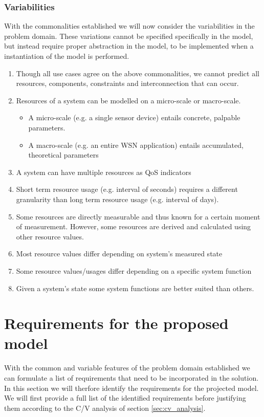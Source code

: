 \subsubsection{Variabilities}
With the commonalities established we will now consider the variabilities in the problem domain. These variations cannot be specified specifically in the model, but instead require proper abstraction in the model, to be implemented when a instantiation of the model is performed.
\begin{enumerate}[label=V\rdmid .\arabic*]
\nospace
\item \label{v:1obvious} Though all use cases agree on the above commonalities, we cannot predict all resources, components, constraints and interconnection that can occur.
\item \label{v:2micro_macro} Resources of a system can be modelled on a micro-scale or macro-scale.
\begin{itemize}
\nospace
\item A micro-scale (e.g. a single sensor device) entails concrete, palpable parameters.
\item A macro-scale (e.g. an entire WSN application) entails accumulated, theoretical parameters
\end{itemize}
\item \label{v:3nr_optimizer} A system can have multiple resources as QoS indicators
\item \label{v:4granularity} Short term resource usage (e.g. interval of seconds) requires a different granularity than long term resource usage (e.g. interval of days).
\item \label{v:5measure_vs_derive} Some resources are directly measurable and thus known for a certain moment of measurement. However, some resources are derived and calculated using other resource values. \cite{feature_model}
\item \label{v:6state} Most resource values differ depending on system's measured state
\item \label{v:7function} Some resource values/usages differ depending on a specific system function
\item \label{v:8rum} Given a system's state some system functions are better suited than others.
\end{enumerate}

\section{Requirements for the proposed model}
With the common and variable features of the problem domain established we can formulate a list of requirements that need to be incorporated in the solution. In this section we will therfore identify the requirements for the projected model. We will first provide a full list of the identified requirements before justifying them according to the C/V analysis of section \ref{sec:cv_analysis}.

